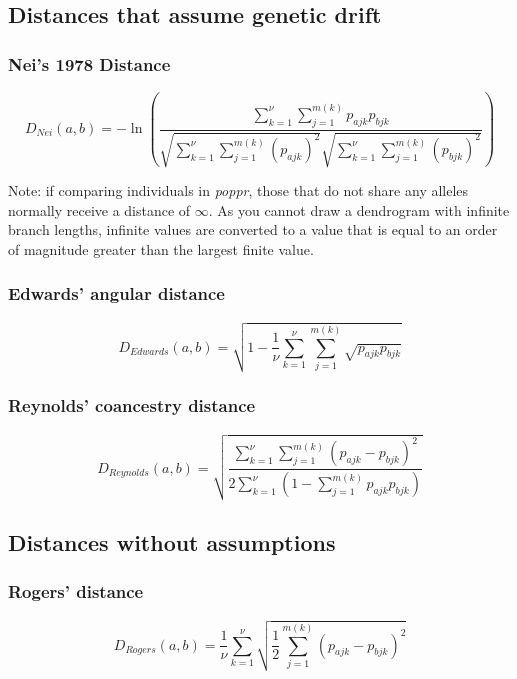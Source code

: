 \documentclass[letterpaper]{article}\usepackage[]{graphicx}\usepackage[]{color}
\newcommand{\poppr}{\textit{poppr}}
\begin{document}
\subsection{Distances that assume genetic drift}
\subsubsection{Nei's 1978 Distance}
\label{distance:nei}
\begin{equation}
  D_{Nei}(a,b)= -\ln\left(\frac{\sum_{k=1}^{\nu} \sum_{j=1}^{m(k)}
  p_{ajk} p_{bjk}}{\sqrt{\sum_{k=1}^{\nu} \sum_{j=1}^{m(k)}
  {(p_{ajk}) }^2}\sqrt{\sum_{k=1}^{\nu} \sum_{j=1}^{m(k)}
  {(p_{bjk})}^2}}\right)
\end{equation}

Note: if comparing individuals in \poppr{}, those that do not share any alleles
normally receive a distance of $\infty$. As you cannot draw a dendrogram with 
infinite branch lengths, infinite values are converted to a value that is equal
to an order of magnitude greater than the largest finite value.

\subsubsection{Edwards' angular distance}
\label{distance:edwards}
\begin{equation}
  D_{Edwards}(a,b)=\sqrt{1-\frac{1}{\nu} \sum_{k=1}^{\nu}
  \sum_{j=1}^{m(k)} \sqrt{p_{ajk}  p_{bjk}}}
\end{equation}

\subsubsection{Reynolds' coancestry distance}
\label{distance:reynolds}
\begin{equation}
  D_{Reynolds}(a,b)=\sqrt{\frac{\sum_{k=1}^{\nu}
  \sum_{j=1}^{m(k)}{(p_{ajk} - p_{bjk})}^2}{2 \sum_{k=1}^{\nu} \left(1-
  \sum_{j=1}^{m(k)}p_{ajk} p_{bjk}\right)}}
\end{equation}

\subsection{Distances without assumptions}
\subsubsection{Rogers' distance}
\label{distance:rogers}
\begin{equation}
  D_{Rogers}(a,b)=\frac{1}{\nu} \sum_{k=1}^{\nu} \sqrt{\frac{1}{2}
  \sum_{j=1}^{m(k)}{(p_{ajk} - p_{bjk})}^2}
\end{equation}
\end{document}

